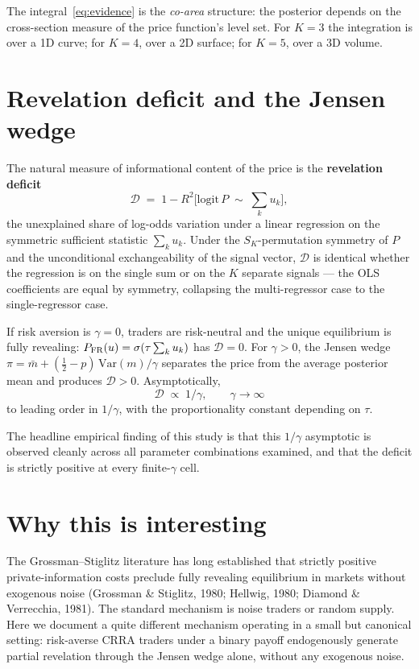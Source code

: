 \documentclass[11pt]{article}
\newcommand{\1}{\mathbf{1}}
\newcommand{\deficit}{\mathcal{D}}
\newcommand{\PFR}{P_{\rm FR}}
\begin{document}
The integral~\eqref{eq:evidence} is the \emph{co-area} structure: the
posterior depends on the cross-section measure of the price function's
level set.  For $K=3$ the integration is over a 1D curve; for $K=4$,
over a 2D surface; for $K=5$, over a 3D volume.

\section{Revelation deficit and the Jensen wedge}
\label{sec:deficit}

The natural measure of informational content of the price is the
\textbf{revelation deficit}
\begin{equation}
\deficit \;=\; 1 - R^2\bigl[\mathrm{logit}\,P \;\sim\; \textstyle\sum_k u_k\bigr],
\label{eq:def}
\end{equation}
the unexplained share of log-odds variation under a linear regression on
the symmetric sufficient statistic $\sum_k u_k$.  Under the
$S_K$-permutation symmetry of $P$ and the unconditional exchangeability
of the signal vector, $\deficit$ is identical whether the regression is
on the single sum or on the $K$ separate signals --- the OLS
coefficients are equal by symmetry, collapsing the multi-regressor case
to the single-regressor case.

If risk aversion is $\gamma=0$, traders are risk-neutral and the unique
equilibrium is fully revealing: $\PFR(u) = \sigma(\tau\sum_k u_k)$ has
$\deficit = 0$.  For $\gamma>0$, the Jensen wedge $\pi = \bar m + (\tfrac12 -
p)\,\mathrm{Var}(m)/\gamma$ separates the price from the average
posterior mean and produces $\deficit>0$.  Asymptotically,
\begin{equation}
\deficit \;\propto\; 1/\gamma, \qquad \gamma\to\infty
\label{eq:asymptotic}
\end{equation}
to leading order in $1/\gamma$, with the proportionality constant
depending on $\tau$.

The headline empirical finding of this study is that this $1/\gamma$
asymptotic is observed cleanly across all parameter combinations
examined, and that the deficit is strictly positive at every
finite-$\gamma$ cell.

\section{Why this is interesting}

The Grossman--Stiglitz literature has long established that strictly
positive private-information costs preclude fully revealing equilibrium
in markets without exogenous noise (Grossman \& Stiglitz, 1980; Hellwig,
1980; Diamond \& Verrecchia, 1981).  The standard mechanism is noise
traders or random supply.  Here we document a quite different mechanism
operating in a small but canonical setting: risk-averse CRRA traders
under a binary payoff endogenously generate partial revelation through
the Jensen wedge alone, without any exogenous noise.
\end{document}
